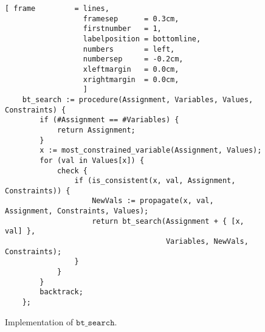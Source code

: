 \begin{figure}[!ht]
\centering
\begin{Verbatim}[ frame         = lines, 
                  framesep      = 0.3cm, 
                  firstnumber   = 1,
                  labelposition = bottomline,
                  numbers       = left,
                  numbersep     = -0.2cm,
                  xleftmargin   = 0.0cm,
                  xrightmargin  = 0.0cm,
                  ]
    bt_search := procedure(Assignment, Variables, Values, Constraints) {
        if (#Assignment == #Variables) {
            return Assignment;
        }
        x := most_constrained_variable(Assignment, Values);
        for (val in Values[x]) {
            check {
                if (is_consistent(x, val, Assignment, Constraints)) {
                    NewVals := propagate(x, val, Assignment, Constraints, Values);
                    return bt_search(Assignment + { [x, val] },
                                     Variables, NewVals, Constraints);
                }
            }
        }
        backtrack;
    };
\end{Verbatim}
\vspace*{-0.3cm}
\caption{Implementation of $\texttt{bt\_search}$.}
\label{fig:csp-constraint-propagation.stlx:bt_search}
\end{figure}

